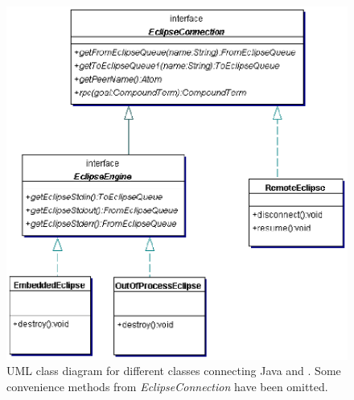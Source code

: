 \begin{center}
  \begin{figure}[htb]
    \begin{center}
        \includegraphics{embjava-diagrams/connection-classes.eps}
    \end{center}
    \caption{\label{fig:ji-connection-classes}UML class diagram for different classes connecting Java and {\eclipse}. Some convenience methods from {\it EclipseConnection} have been omitted.}
  \end{figure}
\end{center}


